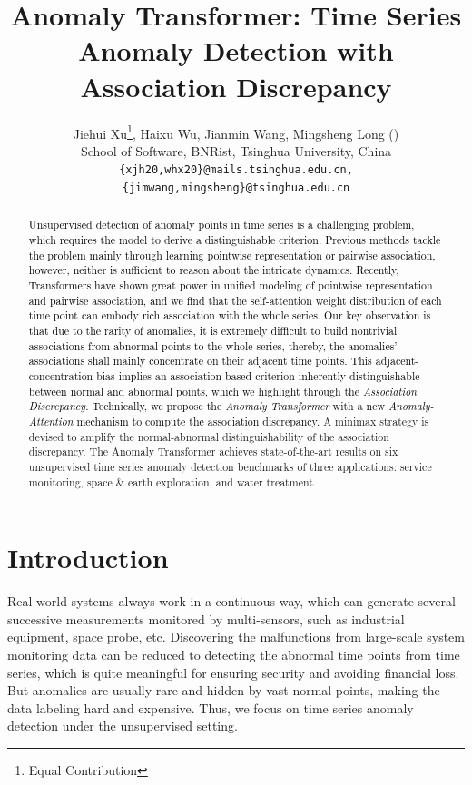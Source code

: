 \documentclass{article} %
\title{Anomaly Transformer: Time Series Anomaly Detection with Association Discrepancy}
\author{%
  Jiehui Xu\thanks{Equal Contribution}, Haixu Wu\footnotemark[1], Jianmin Wang, Mingsheng Long (\Letter) \\
  School of Software, BNRist, Tsinghua University, China \\
  {\texttt{\small \{xjh20,whx20\}@mails.tsinghua.edu.cn, \{jimwang,mingsheng\}@tsinghua.edu.cn}}
}
\newcommand{\update}[1]{{\textcolor{black}{#1}}}
\begin{document}
\maketitle

\begin{abstract}
\update{Unsupervised detection of anomaly points in time series is a challenging problem, which requires the model to derive a distinguishable criterion. Previous methods tackle the problem mainly through learning  pointwise representation or pairwise association, however, neither is sufficient to reason about the intricate dynamics. Recently, Transformers have shown great power in unified modeling of pointwise representation and pairwise association, and we find that the self-attention weight distribution of each time point can embody rich association with the whole series.
Our key observation is that due to the rarity of anomalies, it is extremely difficult to build nontrivial associations from abnormal points to the whole series, thereby, the anomalies' associations shall mainly concentrate on their adjacent time points. This adjacent-concentration bias implies an association-based criterion inherently distinguishable between normal and abnormal points, which we highlight through the \emph{Association Discrepancy}. Technically, we propose the \emph{Anomaly Transformer} with a new \emph{Anomaly-Attention} mechanism to compute the association discrepancy.} A minimax strategy is devised to amplify the normal-abnormal distinguishability of the association discrepancy. The Anomaly Transformer achieves state-of-the-art results on six unsupervised time series anomaly detection benchmarks of three applications: service monitoring, space \& earth exploration, and water treatment.
\end{abstract}



\section{Introduction}


Real-world systems always work in a continuous way, which can generate several successive measurements monitored by multi-sensors, such as industrial equipment, space probe, etc. Discovering the malfunctions from large-scale system monitoring data can be reduced to detecting the abnormal time points from time series, which is quite meaningful for ensuring security and avoiding financial loss. But anomalies are usually rare and hidden by vast normal points, making the data labeling hard and expensive. Thus, we focus on time series anomaly detection under the unsupervised setting.
\end{document}
